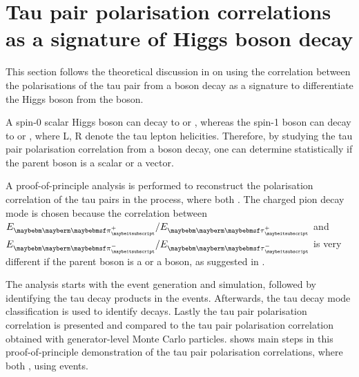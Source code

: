 





\section{Tau pair polarisation correlations as a signature of Higgs boson decay}
\label{sec:tauHZ}

This section follows the theoretical discussion in  on using the correlation between the polarisations of the tau pair from a boson decay as a signature to differentiate the Higgs boson from the \PZ boson.

A  spin-0 scalar Higgs boson can decay to  or , whereas the  spin-1 \PZ  boson can decay to  or , where L, R denote the tau lepton helicities. Therefore, by studying the tau pair polarisation correlation from a boson decay, one can determine statistically if the parent boson is a  scalar or a vector.

A proof-of-principle analysis  is performed to reconstruct the polarisation correlation of the tau pairs in the \ZToTauTau process, where both \tauToPionBoth. The charged pion decay mode is chosen because the correlation between $E_{\Ppiplus} / E_{\APtauon}$ and $E_{\Ppiminus} / E_{\Ptauon}$ is very different if the parent boson is a \PZ or a \PHiggs boson, as suggested in .


The analysis starts with the event generation and simulation, followed by identifying the tau decay products in the events. Afterwards, the tau decay mode classification is used to identify \tauToPionBoth decays. Lastly the tau pair polarisation correlation is presented and compared to  the tau pair polarisation correlation obtained with generator-level Monte Carlo particles.  shows main steps in this proof-of-principle demonstration of the tau pair polarisation correlations, where both \tauToPionBoth, using  \eeZZQQ events.



